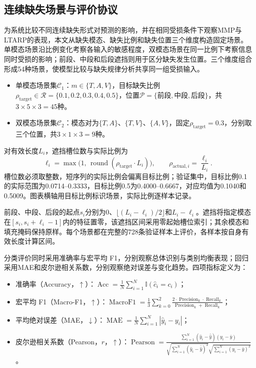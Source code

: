 \subsection{连续缺失场景与评价协议}\label{subsec:q2_benchmark}
\QTwoParagraph 为系统比较不同连续缺失形式对预测的影响，并在相同受损条件下观察MMP与LTARP的表现，本文从缺失模态、缺失比例和缺失位置三个维度构造固定场景。单模态场景沿比例变化考察各输入的敏感程度，双模态场景在同一比例下考察信息同时受损的影响；前段、中段和后段遮挡则用于区分缺失发生位置。三个维度组合形成54种场景，使模型比较与缺失规律分析共享同一组受损输入。

\begin{itemize}[leftmargin=2.5em,itemsep=0pt,topsep=2pt]
\item 单模态场景集$\mathcal C_1$：$m\in\{T,A,V\}$，目标缺失比例$\rho_{\mathrm{target}}\in\mathcal R=\{0.1,0.2,0.3,0.4,0.5\}$，位置$\mathcal P=\{\text{前段},\text{中段},\text{后段}\}$，共$3\times5\times3=45$种。
\item 双模态场景集$\mathcal C_2$：模态对为$\{T,A\}$、$\{T,V\}$、$\{A,V\}$，固定$\rho_{\mathrm{target}}=0.3$，分别取三个位置，共$3\times1\times3=9$种。
\end{itemize}

\QTwoParagraph 对有效长度$L_i$，遮挡槽位数与实际比例为
\begin{equation}
\ell_i = \max\big(1,\, \operatorname{round}(\rho_{\mathrm{target}} \cdot L_i)\big),\qquad
\rho_{\mathrm{actual}, i} = \frac{\ell_i}{L_i}.
\label{eq:q2_mask_len}
\end{equation}
槽位数必须取整数，短序列的实际比例会偏离目标比例；验证集中，目标比例0.1的实际范围为0.0714--0.3333，目标比例0.5为0.4000--0.6667，对应均值为0.1040和0.5009。图表横轴用目标比例标识场景，实际比例逐样本记录。

\QTwoParagraph 前段、中段、后段的起点$s_i$分别为$0$、$\lfloor(L_i-\ell_i)/2\rfloor$和$L_i-\ell_i$。遮挡将指定模态在$[s_i,s_i+\ell_i-1]$内的特征置零，该遮挡区间采用零起始槽位索引；其余模态和填充掩码保持原样。每个场景都在完整的728条验证样本上评价，各样本按自身有效长度计算区间。

\QTwoParagraph 分类评价同时采用准确率与宏平均 F1，分别观察总体识别与类别均衡表现；回归采用MAE和皮尔逊相关系数，分别观察绝对误差与变化趋势。四项指标定义为：
\begin{itemize}[leftmargin=2.5em,itemsep=0pt,topsep=2pt]
  \item 准确率（Accuracy，$\uparrow$）：$\operatorname{Acc} = \frac{1}{N}\sum_{i=1}^N \mathbb I(\hat c_i = c_i)$；
  \item 宏平均 F1（Macro-F1，$\uparrow$）：$\operatorname{MacroF1} = \frac{1}{3}\sum_{k=0}^2 \frac{2 \cdot \operatorname{Precision}_k \cdot \operatorname{Recall}_k}{\operatorname{Precision}_k + \operatorname{Recall}_k}$；
  \item 平均绝对误差（MAE，$\downarrow$）：$\operatorname{MAE} = \frac{1}{N}\sum_{i=1}^N |\hat y_i - y_i|$；
  \item 皮尔逊相关系数（Pearson，$r$，$\uparrow$）：$\operatorname{Pearson} = \frac{\sum_{i=1}^N (\hat y_i - \bar{\hat y})(y_i - \bar y)}{\sqrt{\sum_{i=1}^N (\hat y_i - \bar{\hat y})^2}\sqrt{\sum_{i=1}^N (y_i - \bar y)^2}}$。
\end{itemize}

